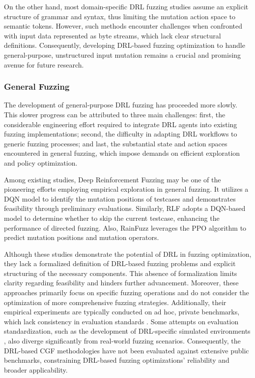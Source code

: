 \documentclass[lettersize,journal]{IEEEtran}
\begin{document}
On the other hand, most domain-specific DRL fuzzing studies assume an explicit structure of grammar and syntax, thus limiting the mutation action space to semantic tokens. However, such methods encounter challenges when confronted with input data represented as byte streams, which lack clear structural definitions. Consequently, developing DRL-based fuzzing optimization to handle general-purpose, unstructured input mutation remains a crucial and promising avenue for future research.

\subsubsection{General Fuzzing}
The development of general‑purpose DRL fuzzing has proceeded more slowly. This slower progress can be attributed to three main challenges: first, the considerable engineering effort required to integrate DRL agents into existing fuzzing implementations; second, the difficulty in adapting DRL workflows to generic fuzzing processes; and last, the substantial state and action spaces encountered in general fuzzing, which impose demands on efficient exploration and policy optimization.

Among existing studies, Deep Reinforcement Fuzzing \cite{bottingerDeepReinforcementFuzzing2018} may be one of the pioneering efforts employing empirical exploration in general fuzzing. It utilizes a DQN model to identify the mutation positions of testcases and demonstrates feasibility through preliminary evaluations. Similarly, RLF \cite{liangRLFDirectedFuzzing2022} adopts a DQN-based model to determine whether to skip the current testcase, enhancing the performance of directed fuzzing. Also, RainFuzz \cite{binosiRainfuzzReinforcementlearningDriven2023} leverages the PPO algorithm to predict mutation positions and mutation operators.

Although these studies demonstrate the potential of DRL in fuzzing optimization, they lack a formalized definition of DRL-based fuzzing problems and explicit structuring of the necessary components. This absence of formalization limits clarity regarding feasibility and hinders further advancement. Moreover, these approaches primarily focus on specific fuzzing operations and do not consider the optimization of more comprehensive fuzzing strategies. Additionally, their empirical experiments are typically conducted on ad hoc, private benchmarks, which lack consistency in evaluation standards \cite{kleesEvaluatingFuzzTesting2018}. Some attempts on evaluation standardization, such as the development of DRL-specific simulated environments \cite{drozdFuzzerGymCompetitiveFramework2018}, also diverge significantly from real-world fuzzing scenarios. Consequently, the DRL-based CGF methodologies have not been evaluated against extensive public benchmarks, constraining DRL-based fuzzing optimizations' reliability and broader applicability.
\end{document}
